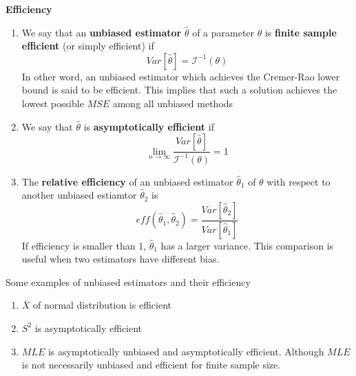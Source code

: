 \documentclass[11pt]{article}
\begin{document}
\begin{defn*}
  \textbf{Efficiency}
  \begin{enumerate}
    \item We say that an \textbf{unbiased estimator} $\hat{\theta}$ of a parameter $\theta$ is \textbf{finite sample efficient} (or simply efficient) if
    \[
      Var[\hat{\theta}] = \mathcal{I}^{-1}(\theta)
    \]
    In other word, an unbiased estimator which achieves the Cremer-Rao lower bound is said to be efficient. This implies that such a solution achieves the lowest possible $MSE$ among all unbiased methods
    \item We say that $\hat{\theta}$ is \textbf{asymptotically efficient} if
    \[
      \lim_{n\to\infty} \frac{Var[\hat{\theta}]}{\mathcal{I}^{-1}(\theta)} = 1
    \]
    \item The \textbf{relative efficiency} of an unbiased estimator $\hat{\theta}_1$ of $\theta$ with respect to another unbiased estiamtor $\hat{\theta}_2$ is
    \[
      eff(\hat{\theta}_1, \hat{\theta}_2) = \frac{Var[\hat{\theta}_2]}{Var[\hat{\theta}_1]}
    \]
    If efficiency is smaller than 1, $\hat{\theta}_1$ has a larger variance. This comparison is useful when two estimators have different bias.
  \end{enumerate}
  \begin{rem}
    $ $\\
    Some examples of unbiased estimators and their efficiency
    \begin{enumerate}
      \item $\overline{X}$ of normal distribution is efficient
      \item $S^2$ is asymptotically efficient
      \item $MLE$ is asymptotically unbiased and asymptotically efficient. Although $MLE$ is not necessarily unbiased and efficient for finite sample size.
    \end{enumerate}
  \end{rem}

\end{defn*}
\end{document}

